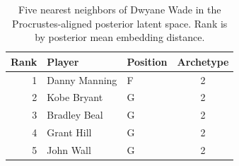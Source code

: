 \begin{table}[htbp]
  \centering\small
  \begin{tabular}{rllc}
    \toprule
    Rank & Player & Position & Archetype \\
    \midrule
    1 & Danny Manning & F & 2 \\
    2 & Kobe Bryant & G & 2 \\
    3 & Bradley Beal & G & 2 \\
    4 & Grant Hill & G & 2 \\
    5 & John Wall & G & 2 \\
    \bottomrule
  \end{tabular}
  \caption{Five nearest neighbors of Dwyane Wade in the Procrustes-aligned posterior latent space. Rank is by posterior mean embedding distance.}
  \label{tab:Dwyane_Wade_neighbors}
\end{table}

